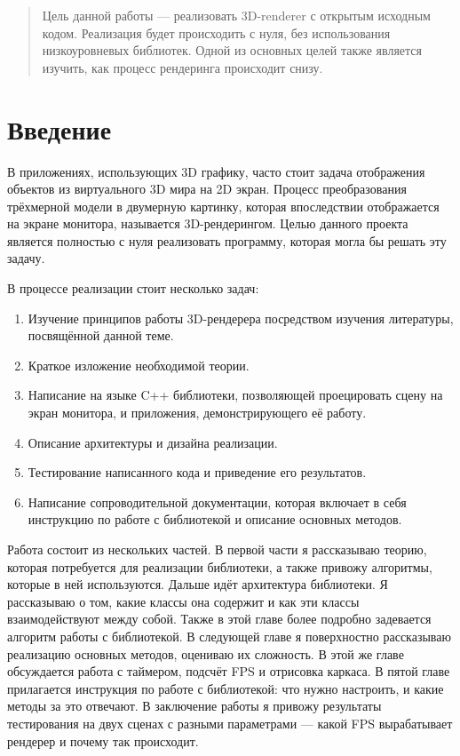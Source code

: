 \documentclass{article}
\begin{document}
\makeTitlePage

{
  \hypersetup{hidelinks}
  \tableofcontents
}

\newpage

\begin{abstract}
	Цель данной работы --- реализовать 3D-renderer с открытым исходным кодом.
	Реализация будет происходить с нуля, без использования низкоуровневых библиотек.
	Одной из основных целей также является изучить, как процесс рендеринга происходит снизу.
\end{abstract}

\section{Введение}

В приложениях, использующих 3D графику, часто стоит задача отображения объектов из виртуального 3D мира на 2D экран.
Процесс преобразования трёхмерной модели в двумерную картинку, которая впоследствии отображается на экране монитора, называется 3D-рендерингом.
Целью данного проекта является полностью с нуля реализовать программу, которая могла бы решать эту задачу.

В процессе реализации стоит несколько задач:

\begin{enumerate}
	\item Изучение принципов работы 3D-рендерера посредством изучения литературы, посвящённой данной теме.
	\item Краткое изложение необходимой теории.
	\item Написание на языке C++ библиотеки, позволяющей проецировать сцену на экран монитора, и приложения, демонстрирующего её работу.
	\item Описание архитектуры и дизайна реализации.
	\item Тестирование написанного кода и приведение его результатов.
	\item Написание сопроводительной документации, которая включает в себя инструкцию по работе с библиотекой и описание основных методов.
\end{enumerate}

Работа состоит из нескольких частей.
В первой части я рассказываю теорию, которая потребуется для реализации библиотеки, а также привожу алгоритмы, которые в ней используются.
Дальше идёт архитектура библиотеки.
Я рассказываю о том, какие классы она содержит и как эти классы взаимодействуют между собой.
Также в этой главе более подробно задевается алгоритм работы с библиотекой.
В следующей главе я поверхностно рассказываю реализацию основных методов, оцениваю их сложность.
В этой же главе обсуждается работа с таймером, подсчёт FPS и отрисовка каркаса.
В пятой главе прилагается инструкция по работе с библиотекой: что нужно настроить, и какие методы за это отвечают.
В заключение работы я привожу результаты тестирования на двух сценах с разными параметрами --- какой FPS вырабатывает рендерер и почему так происходит.
\end{document}
